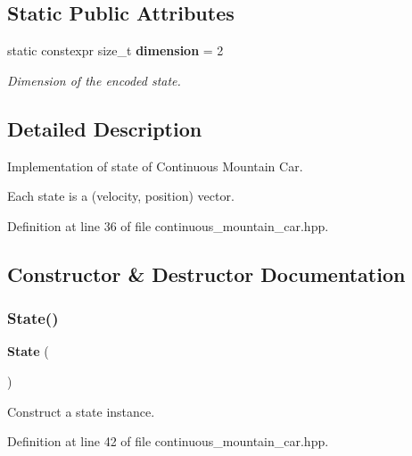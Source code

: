 \subsection*{Static Public Attributes}
\begin{DoxyCompactItemize}
\item 
static constexpr size\+\_\+t \textbf{ dimension} = 2
\begin{DoxyCompactList}\small\item\em Dimension of the encoded state. \end{DoxyCompactList}\end{DoxyCompactItemize}


\subsection{Detailed Description}
Implementation of state of Continuous Mountain Car. 

Each state is a (velocity, position) vector. 

Definition at line 36 of file continuous\+\_\+mountain\+\_\+car.\+hpp.



\subsection{Constructor \& Destructor Documentation}
\mbox{\label{classmlpack_1_1rl_1_1ContinuousMountainCar_1_1State_a790355057d12e9c1ce7643551c16fecd}} 
\subsubsection{State()\hspace{0.1cm}{\footnotesize\ttfamily [1/2]}}
{\footnotesize\ttfamily \textbf{ State} (\begin{DoxyParamCaption}{ }\end{DoxyParamCaption})\hspace{0.3cm}{\ttfamily [inline]}}



Construct a state instance. 



Definition at line 42 of file continuous\+\_\+mountain\+\_\+car.\+hpp.

